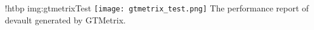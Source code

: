 \namedfigure
{!htbp}
{img:gtmetrixTest}
{\texttt{[image: gtmetrix\_test.png]}}
{The performance report of devault generated by GTMetrix.}
